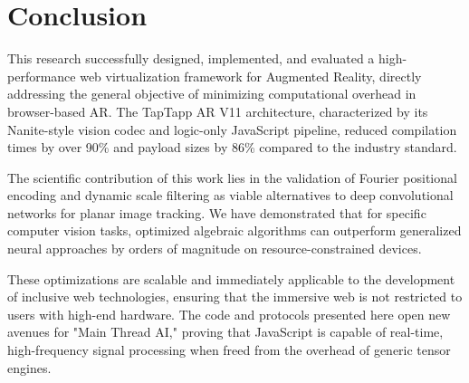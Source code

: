 \section{Conclusion}

This research successfully designed, implemented, and evaluated a high-performance web virtualization framework for Augmented Reality, directly addressing the general objective of minimizing computational overhead in browser-based AR. The TapTapp AR V11 architecture, characterized by its Nanite-style vision codec and logic-only JavaScript pipeline, reduced compilation times by over 90\% and payload sizes by 86\% compared to the industry standard.

The scientific contribution of this work lies in the validation of Fourier positional encoding and dynamic scale filtering as viable alternatives to deep convolutional networks for planar image tracking. We have demonstrated that for specific computer vision tasks, optimized algebraic algorithms can outperform generalized neural approaches by orders of magnitude on resource-constrained devices.

These optimizations are scalable and immediately applicable to the development of inclusive web technologies, ensuring that the immersive web is not restricted to users with high-end hardware. The code and protocols presented here open new avenues for "Main Thread AI," proving that JavaScript is capable of real-time, high-frequency signal processing when freed from the overhead of generic tensor engines.
